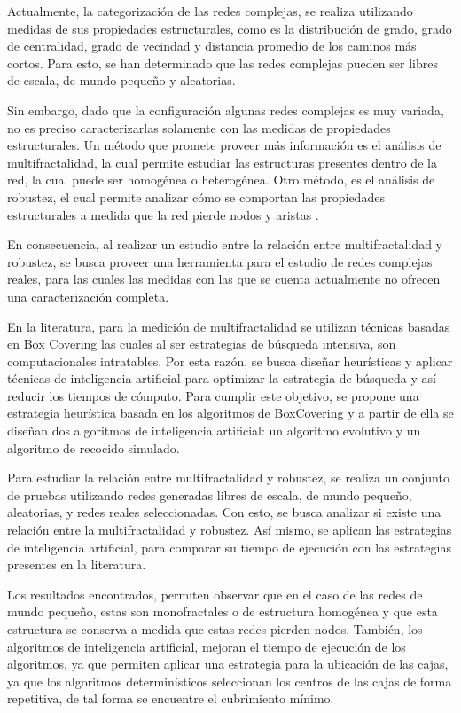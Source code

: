 Actualmente, la categorización de las redes complejas, se realiza utilizando medidas de sus propiedades estructurales, como es la distribución de grado, grado de centralidad, grado de vecindad y distancia promedio de los caminos más cortos. Para esto, se han determinado que las redes complejas pueden ser libres de escala, de mundo pequeño y aleatorias\cite{BarabasiNetwork}.

Sin embargo, dado que la configuración algunas redes complejas es muy variada, no es preciso caracterizarlas solamente con las medidas de propiedades estructurales. Un método que promete proveer más información es el análisis de multifractalidad, la cual permite estudiar las estructuras presentes dentro de la red, la cual puede ser homogénea o heterogénea\cite{Liu2015}. Otro método, es el análisis de robustez, el cual permite analizar cómo se comportan las propiedades estructurales a medida que la red pierde nodos y aristas \cite{Martin-Hernandez2013}.

En consecuencia, al realizar un estudio entre la relación entre multifractalidad y robustez, se busca proveer una herramienta para el estudio de redes complejas reales, para las cuales las medidas con las que se cuenta actualmente no ofrecen una caracterización completa.

En la literatura, para la medición de multifractalidad se utilizan técnicas basadas en Box Covering\cite{Shuhei2011} las cuales al ser estrategias de búsqueda intensiva, son computacionales intratables. Por esta razón, se busca diseñar heurísticas y aplicar técnicas de inteligencia artificial para optimizar la estrategia de búsqueda y así reducir los tiempos de cómputo. Para cumplir este objetivo, se propone una estrategia heurística basada en los algoritmos de BoxCovering y a partir de ella se diseñan dos algoritmos de inteligencia artificial: un algoritmo evolutivo y un algoritmo de recocido simulado.

Para estudiar la relación entre multifractalidad y robustez, se realiza un conjunto de pruebas utilizando redes generadas libres de escala, de mundo pequeño, aleatorias, y redes reales seleccionadas. Con esto, se busca analizar si existe una relación entre la multifractalidad y robustez. Así mismo, se aplican las estrategias de inteligencia artificial, para comparar su tiempo de ejecución con las estrategias presentes en la literatura.

Los resultados encontrados, permiten observar que en el caso de las redes de mundo pequeño, estas son monofractales o de estructura homogénea y que esta estructura se conserva a medida que estas redes pierden nodos. También, los algoritmos de inteligencia artificial, mejoran el tiempo de ejecución de los algoritmos, ya que permiten aplicar una estrategia para la ubicación de las cajas, ya que los algoritmos determinísticos seleccionan los centros de las cajas de forma repetitiva, de tal forma se encuentre el cubrimiento mínimo.



